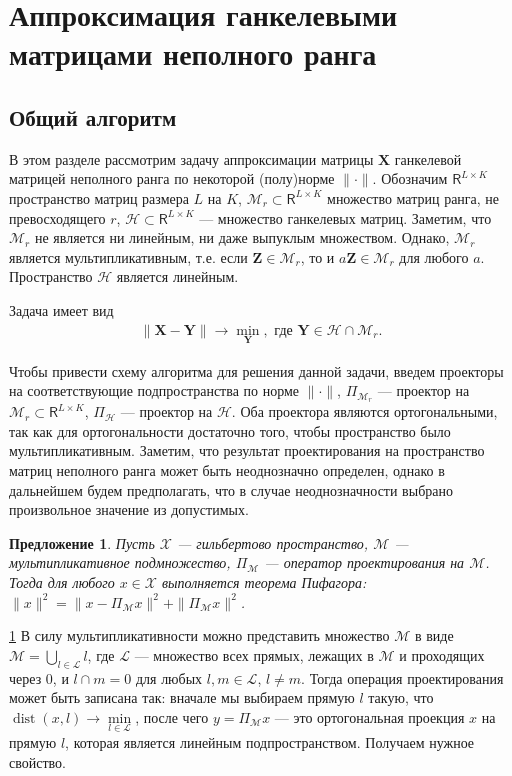 \documentclass[12pt,a4paper,fleqn,leqno]{article}
\newtheorem{proposition}{Предложение}
\newcommand{\bfX}{\mathbf{X}}
\newcommand{\bfY}{\mathbf{Y}}
\newcommand{\bfZ}{\mathbf{Z}}
\newcommand{\calH}{\mathcal{H}}
\newcommand{\calL}{\mathcal{L}}
\newcommand{\calM}{\mathcal{M}}
\newcommand{\calX}{\mathcal{X}}
\def\spaceR{\mathsf{R}}
\newcommand{\be}{\begin{eqnarray}}
\newcommand{\ee}{\end{eqnarray}}
\def\dist{\mathop{\mathrm{dist}}}
\begin{document}
\section{Аппроксимация ганкелевыми матрицами неполного ранга}
\label{sec:lowrank_appr}
\subsection{Общий алгоритм}
В этом разделе рассмотрим задачу аппроксимации матрицы $\bfX$ ганкелевой матрицей неполного ранга по некоторой (полу)норме $\|\cdot\|$.
Обозначим $\spaceR^{L\times K}$ пространство матриц размера $L$ на $K$, $\calM_r\subset \spaceR^{L\times K}$ множество матриц ранга, не превосходящего $r$,
$\calH \subset \spaceR^{L\times K}$ --- множество ганкелевых матриц.
Заметим, что  $\calM_r$ не является ни линейным, ни даже выпуклым множеством. Однако, $\calM_r$ является мультипликативным, т.е.
если $\bfZ\in \calM_r$, то и $a\bfZ\in \calM_r$ для любого $a$.
Пространство $\calH$ является линейным.

Задача имеет вид
\be
\label{eq:gen_task}
\|\bfX - \bfY\| \to \min_\bfY, \mbox{\ где\ } \bfY \in \calH \cap \calM_r.
\ee

Чтобы привести схему алгоритма для решения данной задачи, введем проекторы на соответствующие подпространства
по норме $\|\cdot\|$, $\Pi_{\calM_r}$ --- проектор на $\calM_r\subset \spaceR^{L\times K}$,
$\Pi_{\calH}$ --- проектор на $\calH$.
Оба проектора являются ортогональными,
так как для ортогональности достаточно того, чтобы пространство было мультипликативным. Заметим, что результат проектирования
на пространство матриц неполного ранга может быть неоднозначно определен, однако в дальнейшем будем предполагать, что
в случае неоднозначности выбрано произвольное значение из допустимых.

\begin{proposition} \label{pythaprop}
Пусть $\calX$ --- гильбертово пространство, $\calM$ --- мультипликативное подмножество, $\Pi_\calM$ --- оператор проектирования на $\calM$. Тогда для любого $x \in \calX$ выполняется теорема Пифагора: $\|x\|^2 = \|x - \Pi_\calM x\|^2 + \|\Pi_\calM x\|^2$.
\end{proposition}
\begin{proof5}{\ref{pythaprop}}
В силу мультипликативности можно представить множество $\calM$ в виде $\calM = \bigcup\limits_{l \in \calL}l$, где $\calL$ --- множество всех прямых, лежащих в $\calM$ и проходящих через $0$, и $l \cap m = 0$ для любых $l, m \in \calL$, $l \neq m$. Тогда операция проектирования может быть записана так: вначале мы выбираем прямую $l$ такую, что $\dist(x, l) \rightarrow \min\limits_{l \in \calL}$, после чего $y = \Pi_\calM x$ --- это ортогональная проекция $x$ на прямую $l$, которая является линейным подпространством. Получаем нужное свойство.
\end{proof5}
\end{document}
